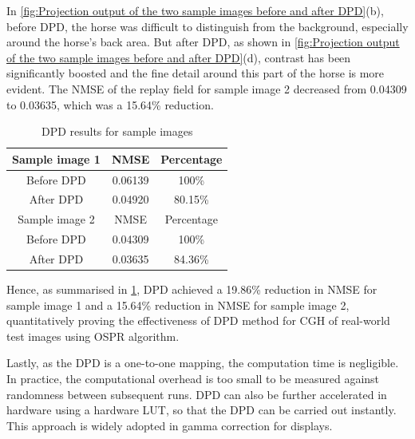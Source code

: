 In \cref{fig:Projection output of the two sample images before and after DPD}(b), before DPD, the horse was difficult to distinguish from the background, especially around the horse's back area. But after DPD, as shown in \cref{fig:Projection output of the two sample images before and after DPD}(d), contrast has been significantly boosted and the fine detail around this part of the horse is more evident. The NMSE of the replay field for sample image 2 decreased from 0.04309 to 0.03635, which was a 15.64\% reduction.


\begin{table}[H]
    \begin{center}
        \begin{tabular}{ccc}
            \hline
            \multicolumn{1}{|c|}{Sample image 1} & \multicolumn{1}{c|}{NMSE}    & \multicolumn{1}{c|}{Percentage} \\ \hline
            \multicolumn{1}{|c|}{Before DPD}     & \multicolumn{1}{c|}{0.06139} & \multicolumn{1}{c|}{100\%}      \\ \hline
            \multicolumn{1}{|c|}{After DPD}      & \multicolumn{1}{c|}{0.04920} & \multicolumn{1}{c|}{80.15\%}    \\ \hline\hline
            \multicolumn{1}{|c|}{Sample image 2} & \multicolumn{1}{c|}{NMSE}     & \multicolumn{1}{c|}{Percentage} \\ \hline
            \multicolumn{1}{|c|}{Before DPD}     & \multicolumn{1}{c|}{0.04309} & \multicolumn{1}{c|}{100\%}      \\ \hline
            \multicolumn{1}{|c|}{After DPD}      & \multicolumn{1}{c|}{0.03635} & \multicolumn{1}{c|}{84.36\%}    \\ \hline
        \end{tabular}
        \caption{DPD results for sample images}
        \label{tab:DPD results for sample images}
    \end{center}
\end{table}

Hence, as summarised in \cref{tab:DPD results for sample images}, DPD achieved a 19.86\% reduction in NMSE for sample image 1 and a 15.64\% reduction in NMSE for sample image 2, quantitatively proving the effectiveness of DPD method for CGH of real-world test images using OSPR algorithm.

Lastly, as the DPD is a one-to-one mapping, the computation time is negligible. In practice, the computational overhead is too small to be measured against randomness between subsequent runs. DPD can also be further accelerated in hardware using a hardware LUT, so that the DPD can be carried out instantly. This approach is widely adopted in gamma correction for displays.




